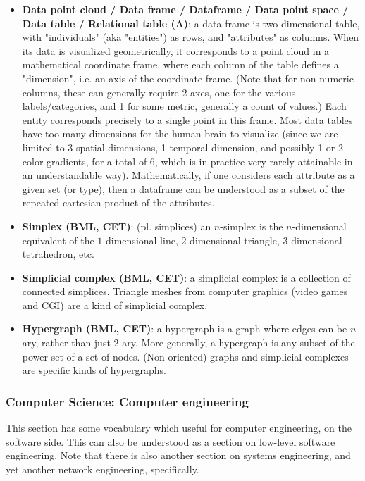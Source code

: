 \documentclass{article}
\begin{document}
\begin{itemize}
	\item \textbf{Data point cloud / Data frame / Dataframe / Data point space / Data table / Relational table (A)}: a data frame is two-dimensional table, with "individuals" (aka "entities") as rows, and "attributes" as columns. When its data is visualized geometrically, it corresponds to a point cloud in a mathematical coordinate frame, where each column of the table defines a "dimension", i.e. an axis of the coordinate frame. (Note that for non-numeric columns, these can generally require 2 axes, one for the various labels/categories, and 1 for some metric, generally a count of values.) Each entity corresponds precisely to a single point in this frame. Most data tables have too many dimensions for the human brain to visualize (since we are limited to 3 spatial dimensions, 1 temporal dimension, and possibly 1 or 2 color gradients, for a total of 6, which is in practice very rarely attainable in an understandable way). Mathematically, if one considers each attribute as a given set (or type), then a dataframe can be understood as a subset of the repeated cartesian product of the attributes.

	\item \textbf{Simplex (BML, CET)}: (pl. simplices) an $n$-simplex is the $n$-dimensional equivalent of the $1$-dimensional line, $2$-dimensional triangle, $3$-dimensional tetrahedron, etc.

	\item \textbf{Simplicial complex (BML, CET)}: a simplicial complex is a collection of connected simplices. Triangle meshes from computer graphics (video games and CGI) are a kind of simplicial complex.

	\item \textbf{Hypergraph (BML, CET)}: a hypergraph is a graph where edges can be $n$-ary, rather than just $2$-ary. More generally, a hypergraph is any subset of the power set of a set of nodes. (Non-oriented) graphs and simplicial complexes are specific kinds of hypergraphs.

\end{itemize}



\subsubsection*{Computer Science: Computer engineering}

This section has some vocabulary which useful for computer engineering, on the software side. This can also be understood as a section on low-level software engineering. Note that there is also another section on systems engineering, and yet another network engineering, specifically.
\end{document}
